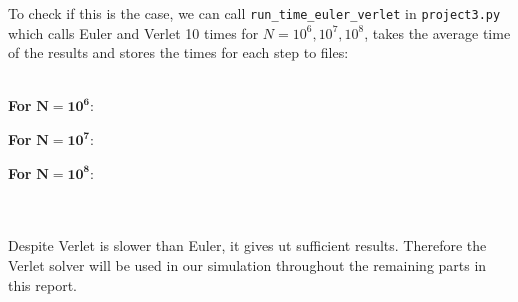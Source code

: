 \documentclass[12pt]{article}
\begin{document}
		   To check if this is the case, we can call \texttt{run\_time\_euler\_verlet} in \texttt{project3.py} which calls Euler and Verlet 10 times for $N = 10^6, 10^7, 10^8 $, takes the average time of the results and stores the times for each step to files: \\ \\
		\begin{multicols}{3}
			\textbf{For} $\mathbf{N = 10^6}$: 
			
			\textbf{For} $\mathbf{N = 10^7}$: 
			
			\textbf{For} $\mathbf{N = 10^8}$: 
			
		\end{multicols}
		 \hfill \\ \\
		Despite Verlet is slower than Euler, it gives ut sufficient results. Therefore the Verlet solver will be used in our simulation throughout the remaining parts in this report. 
\end{document}
